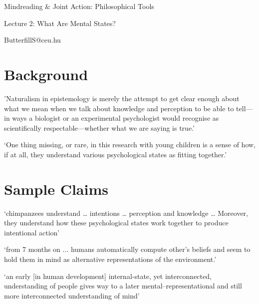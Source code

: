 \documentclass[11pt]{extarticle}
\date{}
\begin{document}
\begin{multicols}{3}

\setlength\footnotesep{1em}









\begin{center}
{\Large
Mindreading \& Joint Action: Philosophical Tools}

Lecture 2: What Are Mental States?


ButterfillS@ceu.hu
\end{center}

\section{Background}
'Naturalism in epistemology is merely the attempt to get clear enough about what we mean when we talk about knowledge and perception to be able to tell—in ways a biologist or an experimental psychologist would recognise as scientifically respectable—whether what we are saying is true.'\citep%
{Dretske:2000ky}

`One thing missing, or rare, in this research with young children is a sense of how, if at all, they understand various psychological states as fitting together.'\citep{Wellman:2000cd}


\section{Sample Claims}
‘chimpanzees understand … intentions … perception and knowledge … Moreover, they understand how these psychological states work together to produce intentional action’\citep{Call:2008di} %

‘from 7 months on ... humans automatically compute other’s beliefs and seem to hold them in mind as alternative representations of the environment.’\citep{kovacs_social_2010} %

`an early [in human development] internal-state, yet interconnected, understanding of people gives way to a later mental–representational and still more interconnected understanding of mind'\citep{Wellman:2000cd} %


\end{multicols}
\end{document}
